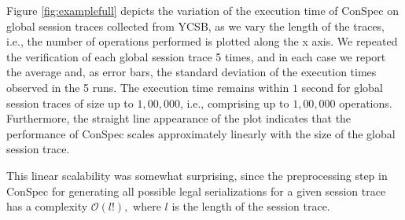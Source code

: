 \documentclass[journal,compsoc]{IEEEtran}
\begin{document}
   Figure \ref{fig:examplefull} depicts the variation of the execution time of ConSpec on global session  traces collected from YCSB, as we vary the length of the traces, i.e., the number of operations performed is plotted along the x axis. We repeated the verification of each global session trace 5 times,  and in each case we report the average and, as error bars, the standard deviation of the execution times observed in the 5 runs.
   The execution time remains within $1$ second for global session traces of size up to $1,00,000$, i.e., comprising up to $1,00,000$  operations. Furthermore, the straight line appearance of the plot indicates that the performance of ConSpec scales approximately linearly with the size of the global session trace.
   \par This linear scalability was somewhat surprising, since the preprocessing step in ConSpec for generating all possible legal serializations for a given session trace has a complexity $\mathcal{O}(\mathit{l}!),$ where $\mathit{l}$ is the length of the session trace.
\end{document}
